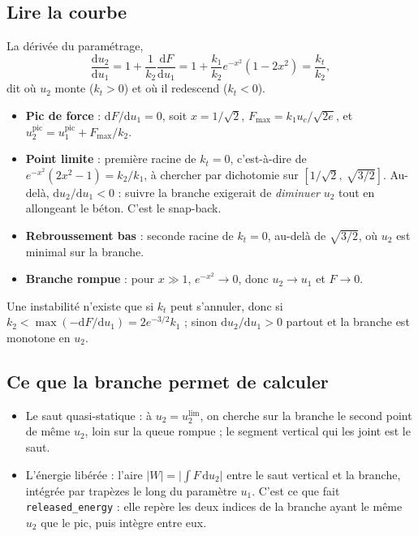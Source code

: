 \documentclass[11pt,a4paper]{article}
\newcommand{\dd}{\mathrm{d}}
\begin{document}
\subsection{Lire la courbe}
La dérivée du paramétrage,
\begin{equation}
  \frac{\dd u_2}{\dd u_1} = 1 + \frac{1}{k_2}\frac{\dd F}{\dd u_1}
  = 1 + \frac{k_1}{k_2}e^{-x^2}(1-2x^2) = \frac{k_t}{k_2},
\end{equation}
dit où $u_2$ monte ($k_t > 0$) et où il redescend ($k_t < 0$).
\begin{itemize}[nosep]
  \item \textbf{Pic de force} : $\dd F/\dd u_1 = 0$, soit $x = 1/\sqrt2$, $F_{\max} = k_1u_c/\sqrt{2e}$,
        et $u_2^{\text{pic}} = u_1^{\text{pic}} + F_{\max}/k_2$.
  \item \textbf{Point limite} : première racine de $k_t = 0$, c'est-à-dire de
        $e^{-x^2}(2x^2-1) = k_2/k_1$, à chercher par dichotomie sur $[1/\sqrt2,\ \sqrt{3/2}]$.
        Au-delà, $\dd u_2/\dd u_1 < 0$ : suivre la branche exigerait de \emph{diminuer} $u_2$
        tout en allongeant le béton. C'est le snap-back.
  \item \textbf{Rebroussement bas} : seconde racine de $k_t = 0$, au-delà de $\sqrt{3/2}$, où
        $u_2$ est minimal sur la branche.
  \item \textbf{Branche rompue} : pour $x \gg 1$, $e^{-x^2}\to0$, donc $u_2 \to u_1$ et $F \to 0$.
\end{itemize}
Une instabilité n'existe que si $k_t$ peut s'annuler, donc si $k_2 < \max(-\dd F/\dd u_1) =
2e^{-3/2}k_1$ ; sinon $\dd u_2/\dd u_1 > 0$ partout et la branche est monotone en $u_2$.

\subsection{Ce que la branche permet de calculer}
\begin{itemize}[nosep]
  \item Le saut quasi-statique : à $u_2 = u_2^{\lim}$, on cherche sur la branche le second
        point de même $u_2$, loin sur la queue rompue ; le segment vertical qui les joint est
        le saut.
  \item L'énergie libérée : l'aire $|W| = \bigl|\int F\,\dd u_2\bigr|$ entre le saut vertical et
        la branche, intégrée par trapèzes le long du paramètre $u_1$. C'est ce que fait
        \texttt{released\_energy} : elle repère les deux indices de la branche ayant le même
        $u_2$ que le pic, puis intègre entre eux.
\end{itemize}
\end{document}
